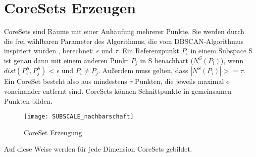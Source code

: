 \section{CoreSets Erzeugen}

CoreSets sind Räume mit einer Anhäufung mehrerer Punkte. Sie werden durch die frei wählbaren Parameter des Algorithmus, die vom
DBSCAN-Algorithmus inspiriert wurden \cite{7022654}, berechnet: $\epsilon$ und $\tau$. Ein
Referenzpunkt $P_{i}$ in
einem Subspace S ist genau dann mit einem anderen Punkt $P_{j}$ in S benachbart ($N^{S}(P_{i})$),
wenn $dist(P_{i}^{S}, P_{j}^{S})$ < $\epsilon$ und $P_{i} \neq P_{j}$. Außerdem muss gelten,
dass
$|N^{S}(P_{i})| >= \tau$. Ein CoreSet besteht also aus mindestens $\tau$ Punkten, die jeweils maximal $\epsilon$ voneinander entfernt sind.
CoreSets können Schnittpunkte in gemeinsamen Punkten bilden.

\begin{figure}[h]
    \centering
    \texttt{[image: SUBSCALE\_nachbarschaft]}
    \caption[Corset Erzeugung]{CoreSet Erzeugung}
    \label{img:CoresetsErzeugen}
\end{figure}


Auf diese Weise werden für jede Dimension CoreSets gebildet.